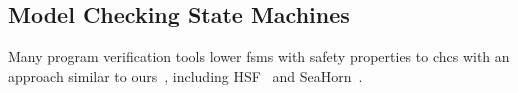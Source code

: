 \documentclass[acmsmall,screen,review]{acmart}
\begin{document}


\subsection{Model Checking State Machines}
Many program verification tools lower \acp{fsm} with safety properties to \acp{chc} with an approach similar to ours~\cite{bjorner2015horn}, including HSF~\cite{hsf} and SeaHorn~\cite{seahorn}.
\end{document}
